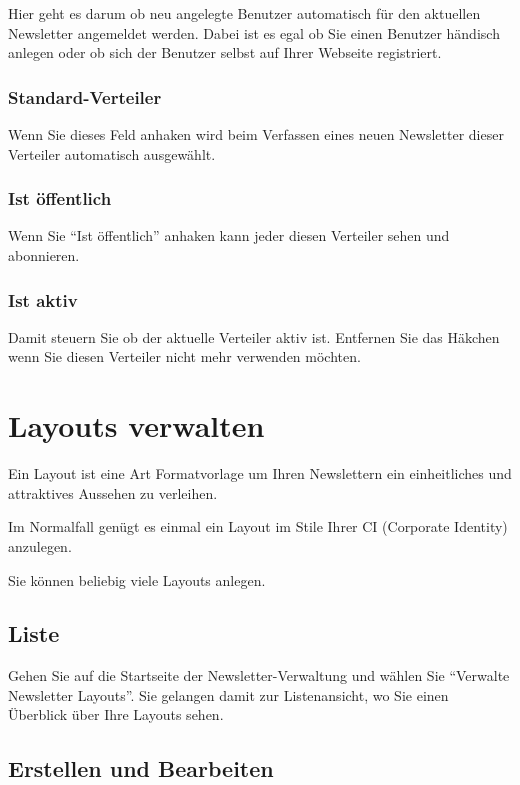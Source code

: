 \documentclass[article, a4paper, oneside, 11pt]{memoir}
\begin{document}
Hier geht es darum ob neu angelegte Benutzer automatisch für den aktuellen Newsletter angemeldet werden.
Dabei ist es egal ob Sie einen Benutzer händisch anlegen oder ob sich der Benutzer selbst auf Ihrer Webseite registriert.

\subsection{Standard-Verteiler}

Wenn Sie dieses Feld anhaken wird beim Verfassen eines neuen Newsletter dieser Verteiler automatisch ausgewählt.

\subsection{Ist öffentlich}

Wenn Sie "`Ist öffentlich"' anhaken kann jeder diesen Verteiler sehen und abonnieren.

\subsection{Ist aktiv}

Damit steuern Sie ob der aktuelle Verteiler aktiv ist. Entfernen Sie das Häkchen wenn Sie diesen Verteiler nicht mehr verwenden möchten.





\chapter{Layouts verwalten}
\label{sec:layouts}

Ein Layout ist eine Art Formatvorlage um Ihren Newslettern ein einheitliches und attraktives Aussehen zu verleihen.

Im Normalfall genügt es einmal ein Layout im Stile Ihrer CI (Corporate Identity) anzulegen.

Sie können beliebig viele Layouts anlegen.


\section{Liste}

Gehen Sie auf die Startseite der Newsletter-Verwaltung und wählen Sie "`Verwalte Newsletter Layouts"'. Sie gelangen damit zur Listenansicht, wo Sie einen Überblick über Ihre Layouts sehen.

\section{Erstellen und Bearbeiten}
\label{sec:create-layout}
\end{document}
